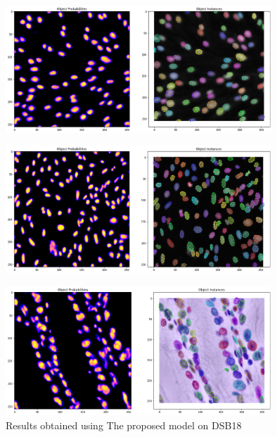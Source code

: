 \documentclass[main.tex]{subfiles}
\begin{document}
\begin{figure}[H]
    \centering
    \includegraphics[width=10cm]{presentationImages/output_13_167.png}
\end{figure}

\begin{figure}[H]
    \centering
    \includegraphics[width=10cm]{presentationImages/output_13_251.png}
\end{figure}

\begin{figure}[H]
    \centering
    \includegraphics[width=10cm]{presentationImages/output_13_255.png}
    \caption{Results obtained using The proposed model on DSB18}
\end{figure}
\end{document}
